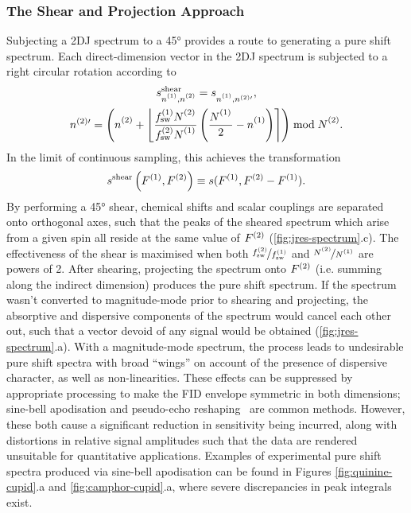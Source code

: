 \subsubsection{The Shear and Projection Approach}
Subjecting a \ac{2DJ} spectrum to a \ang{45} provides a route to generating a
pure shift spectrum. Each direct-dimension vector in the
\ac{2DJ} spectrum is subjected to a right circular rotation according to
\begin{subequations}
    \begin{gather}
        s_{\none,\ntwo}^{\text{shear}} =
            s_{\none,n^{(2)\prime}}^{\vphantom{{\text{tilt}}}},\\
        n^{(2)\prime} = \left(\ntwo + \left\lfloor
                \frac
                    {\fswone \Ntwo\vpsub{\mathrm{sw}}}
                    {\fswtwo \None\vpsub{\mathrm{sw}}}
                \left(
                    \frac{\None\vpsub{\mathrm{sw}}}{2} - \none
                \right)
            \right\rceil
        \right) \bmod \Ntwo.
    \end{gather}
\end{subequations}
In the limit of continuous sampling, this achieves the transformation
\[
    s^{\text{shear}}\left(F^{(1)},F^{(2)}\right) \equiv s(F^{(1)}, F^{(2)} - F^{(1)}).
\]
By performing a \ang{45} shear, chemical shifts and scalar couplings are
separated onto orthogonal axes,
such that the peaks of the sheared spectrum which arise from a given spin all
reside at the same value of $F^{(2)}$ (\cref{fig:jres-spectrum}.c). The
effectiveness of the shear is maximised when both $\nicefrac{f_{\mathrm{sw}}^{(2)}}{f_{\mathrm{sw}}^{(1)}}$
and $\nicefrac{\Ntwo}{\None}$ are powers of 2. After shearing, projecting the
spectrum onto $F^{(2)}$ (i.e. summing along the indirect dimension) produces
the pure shift spectrum.
If the spectrum wasn't converted to magnitude-mode prior to shearing and
projecting, the absorptive and dispersive components of the spectrum would
cancel each other out, such that a vector devoid of any signal would be
obtained (\cref{fig:jres-spectrum}.a).
With a magnitude-mode spectrum, the process leads to undesirable pure shift
spectra with broad ``wings'' on account of the presence of dispersive
character, as well as non-linearities. These effects can be suppressed by
appropriate
processing to make the FID envelope symmetric in both dimensions;
sine-bell apodisation and pseudo-echo reshaping~\cite{Bax1981} are common methods.
However, these both cause a significant reduction in sensitivity being
incurred, along with distortions in relative signal amplitudes such that the data
are rendered unsuitable for quantitative applications. Examples of experimental
pure shift spectra produced via sine-bell apodisation can be found in Figures
\ref{fig:quinine-cupid}.a and \ref{fig:camphor-cupid}.a, where severe
discrepancies in peak integrals exist.


